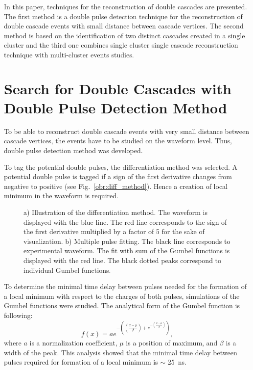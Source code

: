 \documentclass[a4paper,11pt]{article}
\begin{document}
In this paper, techniques for the reconstruction of double cascades are presented. The first method is a double pulse detection technique for the reconstruction of double cascade events with small distance between cascade vertices. The second method is based on the identification of two distinct cascades created in a single cluster and the third one combines single cluster single cascade reconstruction technique with multi-cluster events studies.


\section{Search for Double Cascades with Double Pulse Detection Method}

To be able to reconstruct double cascade events with very small distance between cascade vertices, the events have to be studied on the waveform level. Thus, double pulse detection method was developed.

To tag the potential double pulses, the differentiation method was selected. A potential double pulse is tagged if a sign of the first derivative changes from negative to positive (see Fig.~\ref{obr:diff_method}). Hence a creation of local minimum in the waveform is required.

\begin{figure}[h!]
	\centering
	\begin{multicols}{2}
		\centering
	\end{multicols}
	\caption{a) Illustration of the differentiation method. The waveform is displayed with the blue line. The red line corresponds to the sign of the first derivative multiplied by a factor of 5 for the sake of visualization. b) Multiple pulse fitting. The black line corresponds to experimental waveform. The fit with sum of the Gumbel functions is displayed with the red line. The black dotted peaks correspond to individual Gumbel functions.}
	\label{fig:Waveforms}
\end{figure}



To determine the minimal time delay between pulses needed for the formation of a local minimum with respect to the charges of both pulses, simulations of the Gumbel functions were studied. The analytical form of the Gumbel function is following:
\begin{equation}
f(x)=a e^{-((\frac{x-\mu}{\beta})+e^{-(\frac{x-\mu}{\beta})})},
\label{eq:Gumbel}
\end{equation}
where $a$ is a normalization coefficient, $\mu$ is a position of maximum, and $\beta$ is a width of the peak. This analysis showed that the minimal time delay between pulses required for formation of a local minimum is $\sim$ 25~ns.
\end{document}

